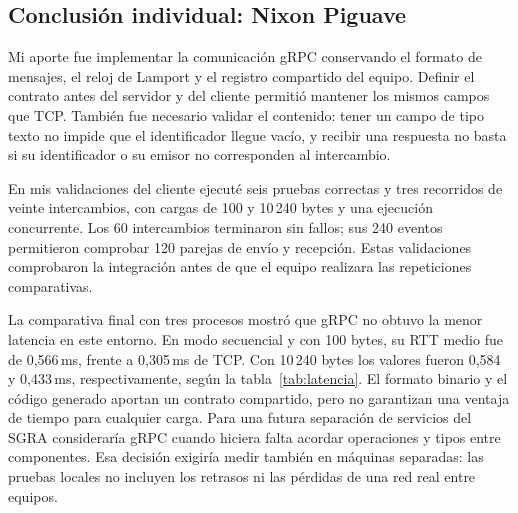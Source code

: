 \subsection{Conclusión individual: Nixon Piguave}
Mi aporte fue implementar la comunicación gRPC conservando el formato de mensajes,
el reloj de Lamport y el registro compartido del equipo. Definir el contrato antes
del servidor y del cliente permitió mantener los mismos campos que TCP. También
fue necesario validar el contenido: tener un campo de tipo texto no impide que el
identificador llegue vacío, y recibir una respuesta no basta si su identificador
o su emisor no corresponden al intercambio.

En mis validaciones del cliente ejecuté seis pruebas correctas y tres recorridos
de veinte intercambios, con cargas de 100 y 10\,240 bytes y una ejecución
concurrente. Los 60 intercambios terminaron sin fallos; sus 240 eventos permitieron
comprobar 120 parejas de envío y recepción. Estas validaciones comprobaron la
integración antes de que el equipo realizara las repeticiones comparativas.

La comparativa final con tres procesos mostró que gRPC no obtuvo la menor latencia
en este entorno. En modo secuencial y con 100 bytes, su RTT medio fue de
0,566\,ms, frente a 0,305\,ms de TCP. Con 10\,240 bytes los valores fueron
0,584 y 0,433\,ms, respectivamente, según la tabla~\ref{tab:latencia}. El formato
binario y el código generado aportan un contrato compartido, pero no garantizan
una ventaja de tiempo para cualquier carga. Para una futura separación de
servicios del SGRA consideraría gRPC cuando hiciera falta acordar operaciones y
tipos entre componentes. Esa decisión exigiría medir también en máquinas
separadas: las pruebas locales no incluyen los retrasos ni las pérdidas de una
red real entre equipos.
